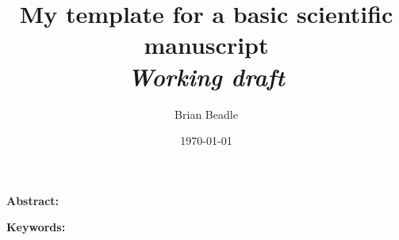 \documentclass[a4paper,12pt]{article}
\title{My template for a basic scientific manuscript \\ \vspace{1cm} \normalsize{\textit{Working draft}}}
\author{Brian Beadle}
\date{\today}
\begin{document}
\maketitle
\doublespacing

\textbf{Abstract:} 

\textbf{Keywords:} 

\newpage




 \newpage
 \newpage
\appendix 
\end{document}
